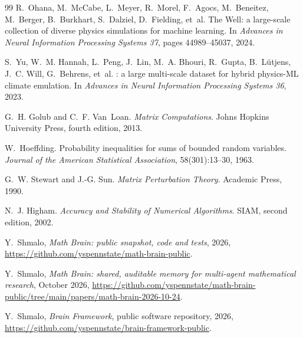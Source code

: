 \begin{thebibliography}{99}
R.~Ohana, M.~McCabe, L.~Meyer, R.~Morel, F.~Agocs, M.~Beneitez, M.~Berger, B.~Burkhart,
S.~Dalziel, D.~Fielding, et~al.
\newblock The Well: a large-scale collection of diverse physics simulations for machine
learning.
\newblock In \emph{Advances in Neural Information Processing Systems 37}, pages
44989--45037, 2024.

S.~Yu, W.~M. Hannah, L.~Peng, J.~Lin, M.~A. Bhouri, R.~Gupta, B.~L\"utjens, J.~C. Will,
G.~Behrens, et~al.
: a large multi-scale dataset for hybrid physics-{ML} climate emulation.
\newblock In \emph{Advances in Neural Information Processing Systems 36}, 2023.

G.~H. Golub and C.~F. Van~Loan.
\newblock \emph{Matrix Computations}.
\newblock Johns Hopkins University Press, fourth edition, 2013.

W.~Hoeffding.
\newblock Probability inequalities for sums of bounded random variables.
\newblock \emph{Journal of the American Statistical Association}, 58(301):13--30, 1963.

G.~W. Stewart and J.-G. Sun.
\newblock \emph{Matrix Perturbation Theory}.
\newblock Academic Press, 1990.

N.~J. Higham.
\newblock \emph{Accuracy and Stability of Numerical Algorithms}.
\newblock SIAM, second edition, 2002.

 Y.~Shmalo, \emph{Math Brain: public snapshot, code and tests}, 2026, \url{https://github.com/yspennstate/math-brain-public}.

 Y.~Shmalo, \emph{Math Brain: shared, auditable memory for multi-agent mathematical research}, October 2026, \url{https://github.com/yspennstate/math-brain-public/tree/main/papers/math-brain-2026-10-24}.

 Y.~Shmalo, \emph{Brain Framework}, public software repository, 2026, \url{https://github.com/yspennstate/brain-framework-public}.

\end{thebibliography}
